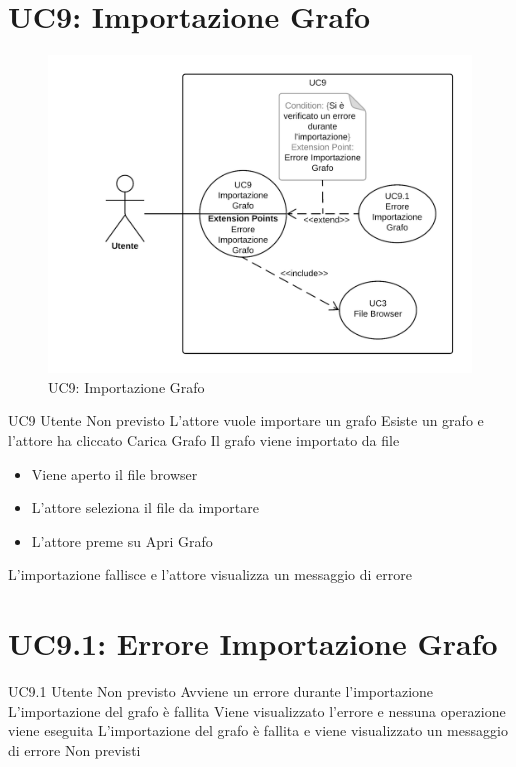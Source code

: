 \documentclass[../AnalisideiRequisiti.tex]{subfiles}
\begin{document}
\section{UC9: Importazione Grafo}
\begin{figure}[H]
	\centering
	\includegraphics[width=\textwidth]{../img/UC9.png}
	\caption{UC9: Importazione Grafo}
\end{figure}
\UserCase
{UC9}
{Utente}
{Non previsto}
{L'attore vuole importare un grafo}
{Esiste un grafo e l'attore ha cliccato Carica Grafo}
{Il grafo viene importato da file}
{
	\begin{itemize}
			\item{} Viene aperto il file browser 
			\item{} L'attore seleziona il file da importare 
			\item{} L'attore preme su Apri Grafo
	\end{itemize}
}
{L'importazione fallisce e l'attore visualizza un messaggio di errore }

\section{UC9.1: Errore Importazione Grafo}
\UserCase
{UC9.1}
{Utente}
{Non previsto}
{Avviene un errore durante l'importazione}
{L'importazione del grafo è fallita}
{Viene visualizzato l'errore e nessuna operazione viene eseguita}
{L'importazione del grafo è fallita e viene visualizzato un messaggio di errore}
{Non previsti}
\end{document}
